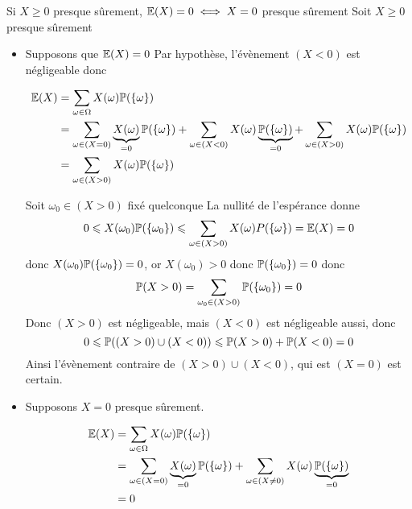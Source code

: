 \documentclass{article}
\begin{document}
\begin{question_kholle}{Si $X \geqslant 0$ presque sûrement, $\mathbb E(X) = 0 \iff X = 0$ presque sûrement}
	Soit $X\geqslant 0$ presque sûrement
	\begin{itemize}
		\item Supposons que $\mathbb E(X) = 0$
		Par hypothèse, l'évènement $(X<0)$ est négligeable donc
		
		\begin{align*}
			\mathbb E (X) & = \sum_{\omega \in \Omega}X(\omega)\mathbb P(\{ \omega \}) \\
			&= \sum_{\omega \in (X = 0)} \underbrace{ X(\omega) }_{ = 0 } \mathbb P(\{ \omega  \}) + \sum_{\omega \in (X<0)}X(\omega) \underbrace{ \mathbb P(\{ \omega \}) }_{ =0 } + \sum_{\omega \in (X >0)} X(\omega)\mathbb P(\{ \omega \}) \\
			&= \sum_{\omega \in (X >0)} X(\omega)\mathbb P(\{ \omega \})
		\end{align*}
		
		Soit $\omega_{0} \in (X>0)$ fixé quelconque
		La nullité de l'espérance donne
		$$0 \leqslant X(\omega_{0})\mathbb P(\{ \omega_{0} \}) \leqslant \sum_{\omega \in(X>0)}X(\omega) P(\{ \omega \})= \mathbb E(X) = 0$$
		donc $X(\omega_{0})\mathbb P(\{ \omega_{0} \}) = 0$, or $X(\omega_{0})>0$ donc $\mathbb P(\{ \omega_{0} \})=0$
		donc 
		$$\mathbb P(X>0) = \sum_{\omega_{0} \in (X>0)} \mathbb P(\{ \omega_{0} \}) = 0$$
		Donc  $(X>0)$ est négligeable, mais $(X<0)$ est négligeable aussi, donc
		$$0\leqslant \mathbb P((X>0) \cup (X<0))\leqslant \mathbb P(X>0) + \mathbb P(X<0)=0$$
		Ainsi l'évènement contraire de $(X>0) \cup (X<0)$, qui est $(X=0)$ est certain.
		
		\item Supposons $X=0$ presque sûrement.
		
		\begin{align*}
			\mathbb E(X) &= \sum_{\omega \in \Omega}X(\omega)\mathbb P(\{ \omega \}) \\
			&= \sum_{\omega \in (X = 0)} \underbrace{ X(\omega) }_{ =0 } \mathbb P(\{ \omega \}) + \sum_{\omega \in (X \neq 0)} X(\omega) \underbrace{ \mathbb P(\{ \omega \}) }_{ =0 } \\
			&= 0
		\end{align*}
		
	\end{itemize}
\end{question_kholle}
\end{document}
